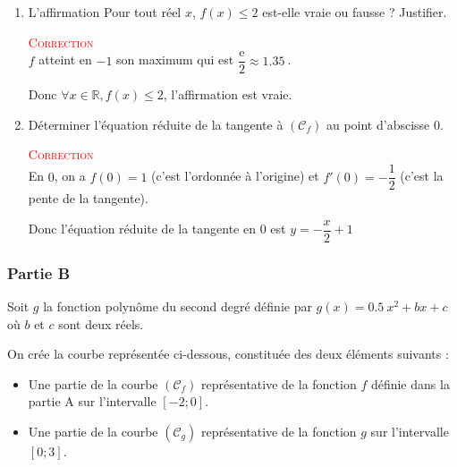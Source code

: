 \documentclass[10pt]{article}
\providecommand{\R}{\mathbb{R}}
\providecommand{\e}{{\mathrm{e}}}
\providecommand{\np}[2][]{{#2~#1}}
\begin{document}
\begin{enumerate}
	\item L'affirmation \og{}Pour tout réel $x$, \mbox{$f(x)\leqslant2$}\fg{} est-elle vraie ou fausse ? Justifier.

	\textcolor{red}{\textsc{Correction}}\\
	$f$ atteint en $-1$ son maximum qui est $\dfrac{\e}{2}\approx\np{1.35}$.

	Donc \mbox{$\forall x\in\R, f(x)\leqslant2$}, l'affirmation est vraie.
	\item Déterminer l'équation réduite de la tangente à \mbox{$(\mathcal{C}_f)$} au point d'abscisse 0.

	\textcolor{red}{\textsc{Correction}}\\
	En $0$, on a $f(0)=1$ (c'est l'ordonnée à l'origine) et $f'(0)=-\dfrac12$ (c'est la pente de la tangente).

	Donc l'équation réduite de la tangente en $0$ est \mbox{$y=-\dfrac x 2 +1$}
\end{enumerate}

\subsubsection*{Partie B}

Soit $g$ la fonction polynôme du second degré définie par \mbox{$g(x)=\np{0.5}x^2+bx+c$} où $b$ et $c$ sont deux réels.

On crée la courbe représentée ci-dessous, constituée des deux éléments suivants :
\begin{itemize}[label=$\bullet$]
	\item Une partie de la courbe \mbox{$(\mathcal{C}_f)$} représentative de la fonction $f$ définie dans la partie A sur l'intervalle \mbox{$[-2;0]$}.



	\item Une partie de la courbe \mbox{$(\mathcal{C}_g)$} représentative de la fonction $g$  sur l'intervalle \mbox{$[0;3]$}.
\end{itemize}
\end{document}
